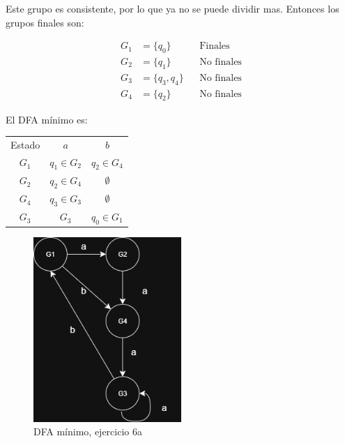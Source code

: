 Este grupo es consistente, por lo que ya no se puede dividir mas. Entonces los grupos finales son:

\begin{center}
\begin{align*}
    G_1 &= \{q_0\} && \text{Finales} \\
    G_2 &= \{q_1\} && \text{No finales} \\
    G_3 &= \{q_3, q_4\} && \text{No finales} \\
    G_4 &= \{q_2\} && \text{No finales}
\end{align*}
\end{center}

El DFA mínimo es:

\begin{center}
\begin{tabular} {|c|c|c|}
    \hline
    Estado    & $a$ & $b$ \\
    $G_1$ & $q_1 \in G_2$ & $q_2 \in G_4$ \\ 
    $G_2$ & $q_2 \in G_4$ & $\emptyset$ \\
    $G_4$ & $q_3 \in G_3$ & $\emptyset$ \\
    $G_3$ & $G_3$ & $q_0 \in G_1$ \\
    \hline
\end{tabular}
\end{center}


\begin{figure}[h!]
        \centering
        \includegraphics[width=0.5\textwidth]{images/ejercicio6a.png}
        \caption{DFA mínimo, ejercicio 6a}
\end{figure}
